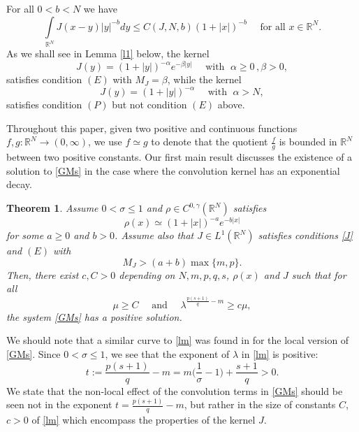 \documentclass[leqno,12pt]{article}
\newcommand{\intl}{\int\limits}
\newcommand{\R}{\mathbb R}
\newtheorem{theorem}{Theorem}[section]
\numberwithin{equation}{section}
\begin{document}
For all $0<b<N$ we have 
\begin{equation}\label{P}
\intl_{\R^N}J(x-y)|y|^{-b} dy\leq C(J,N,b) (1+|x|)^{-b}\quad\mbox{ for all }x\in \R^N.
\end{equation}
As we shall see in Lemma \ref{l1} below, the kernel
$$
J(y)=(1+|y|)^{-\alpha}e^{-\beta|y|} \quad\mbox{ with }\; \alpha\geq 0\, , \beta>0,
$$
satisfies condition $(E)$ with $M_J=\beta$, while the kernel 
$$
J(y)=(1+|y|)^{-\alpha} \quad\mbox{ with }\; \alpha>N,
$$
satisfies condition $(P)$ but not condition $(E)$ above. 

 Throughout this paper, given two positive and continuous functions $f, g:\R^N\to (0, \infty)$, we use $f\simeq g$ to denote that the quotient $\frac{f}{g}$ is bounded in $\R^N$ between two positive constants.
Our first main result discusses the existence of a solution to \eqref{GMs} in the case where the convolution kernel has an exponential decay.
\begin{theorem}\label{ths}
Assume $0<\sigma\leq 1$ and $\rho\in C^{0,\gamma}(\R^N)$ satisfies 
\begin{equation}\label{ro}
\rho(x)\simeq (1+|x|)^{-a}e^{-b|x|}
\end{equation} 
for some $a\geq 0$ and $b>0$. Assume also that $J\in L^1(\R^N)$  satisfies conditions \eqref{J} and $(E)$ with 
\begin{equation}\label{mj}
M_J>(a+b)\max\{m, p\}.
\end{equation} 
Then, there exist $c,C>0$ depending on $N, m,p,q,s$, $\rho(x)$ and $J$ such that for all
\begin{equation}\label{lm}
\mu\geq C \quad \mbox{ and }\quad \lambda^{\frac{p(s+1)}{q}-m}\geq c\mu,
\end{equation}
the system \eqref{GMs} has a positive solution.  
\end{theorem}
We should note that a similar curve to \eqref{lm} was found in \cite[Theorem 1.1]{G23} for the local version of \eqref{GMs}. Since $0<\sigma\leq 1$, we see that the exponent of $\lambda$ in \eqref{lm} is positive:
$$
t:=\frac{p(s+1)}{q}-m=m\Big(\frac{1}{\sigma}-1\Big)+\frac{s+1}{q}>0.
$$
We state that the non-local effect of the convolution terms in \eqref{GMs} should be seen not in the exponent $t=\frac{p(s+1)}{q}-m$, but rather in the size of constants $C$, $c>0$ of \eqref{lm} which encompass the properties of the kernel $J$.
\end{document}
